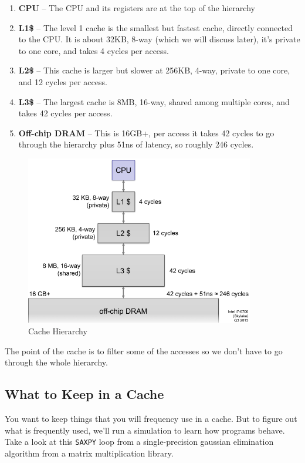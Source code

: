 \documentclass{article}
\begin{document}
\begin{enumerate}
\item \textbf{CPU} -- The CPU and its registers are at the top of the hierarchy

\item \textbf{L1\$} -- The level 1 cache is the smallest but fastest cache, directly connected to the CPU. It is about 32KB, 8-way (which we will discuss later), it's private to one core, and takes 4 cycles per access.

\item \textbf{L2\$} -- This cache is larger but slower at 256KB, 4-way, private to one core, and 12 cycles per access.

\item \textbf{L3\$} -- The largest cache is 8MB, 16-way, shared among multiple cores, and takes 42 cycles per access.

\item \textbf{Off-chip DRAM} -- This is 16GB+, per access it takes 42 cycles to go through the hierarchy plus 51ns of latency, so roughly 246 cycles.
\end{enumerate}



\begin{figure}[ht!]
\centering
\includegraphics[width=100mm]{img/CacheHierarchy.png}
\caption{Cache Hierarchy}
\end{figure}

The point of the cache is to filter some of the accesses so we don't have to go through the whole hierarchy. 

\subsection{What to Keep in a Cache}

You want to keep things that you will frequency use in a cache. But to figure out what is frequently used, we'll run a simulation to learn how programs behave. Take a look at this \verb|SAXPY| loop from a single-precision gaussian elimination algorithm from a matrix multiplication library.
\end{document}

